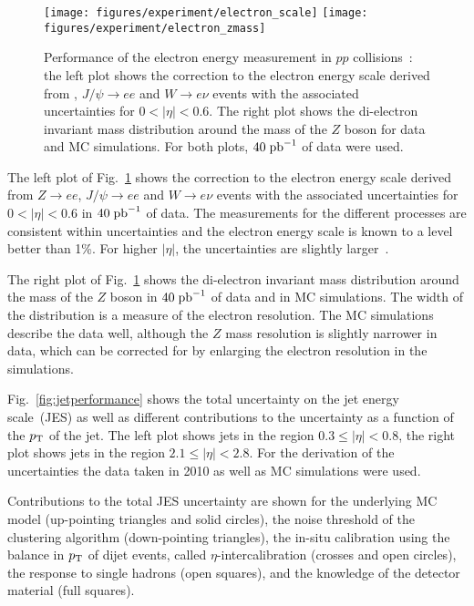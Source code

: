 \begin{figure}[h!]
\begin{center}
\texttt{[image: figures/experiment/electron\_scale]}
\texttt{[image: figures/experiment/electron\_zmass]}
\caption[Electron energy performance]{
  Performance of the electron energy measurement in $pp$ collisions~\cite{electronperformance}:
  the left plot shows the correction to the electron energy scale derived from \Zee, \mbox{$J/\psi \to ee$} and \mbox{$W \to e\nu$}
  events with the associated uncertainties for \mbox{$0 < |\eta| < 0.6$}.
  The right plot shows the di-electron invariant mass distribution around the mass of the $Z$ boson for data and MC simulations.
  For both plots, \mbox{$40 \; \mathrm{pb}^{-1}$} of data were used.
}
\label{fig:electronperformance}
\end{center}
\end{figure}

The left plot of Fig.~\ref{fig:electronperformance} shows the correction to the electron energy scale derived from \mbox{$Z \to ee$},
\mbox{$J/\psi \to ee$} and \mbox{$W \to e\nu$} events with the associated uncertainties for \mbox{$0 < |\eta| < 0.6$} in \mbox{$40 \; \mathrm{pb}^{-1}$} of data.
The measurements for the different processes are consistent within uncertainties and the electron energy scale is known to a level better than 1\%.
For higher $|\eta|$, the uncertainties are slightly larger~\cite{electronperformance}.

The right plot of Fig.~\ref{fig:electronperformance} shows the di-electron invariant mass distribution around the mass of the $Z$ boson in \mbox{$40 \; \mathrm{pb}^{-1}$}
of data and in MC simulations.
The width of the distribution is a measure of the electron resolution.
The MC simulations describe the data well, although the $Z$ mass resolution is slightly narrower in data, which can be corrected for by enlarging
the electron resolution in the simulations.

Fig.~\ref{fig:jetperformance} shows the total uncertainty on the jet energy scale~(JES) as well as different contributions to the uncertainty as a
function of the $p_{\mathrm{T}}$ of the jet.
The left plot shows jets in the region \mbox{$0.3 \leq |\eta| < 0.8$}, the right plot shows jets in the region \mbox{$2.1 \leq |\eta| < 2.8$}.
For the derivation of the uncertainties the data taken in 2010 as well as MC simulations were used.

Contributions to the total JES uncertainty are shown for
the underlying MC model (up-pointing triangles and solid circles),
the noise threshold of the clustering algorithm (down-pointing triangles),
the in-situ calibration using the balance in $p_{\mathrm{T}}$ of dijet events, called $\eta$-intercalibration (crosses and open circles),
the response to single hadrons (open squares), 
and the knowledge of the detector material (full squares).

